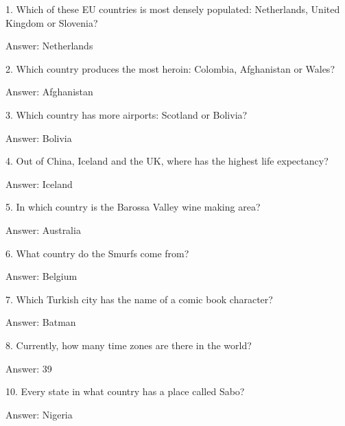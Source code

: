 \documentclass{beamer}
\begin{document}
    \begin{frame}
        1. Which of these EU countries is most densely populated: Netherlands,
        United Kingdom or Slovenia?

        Answer: Netherlands
    \end{frame}

    \begin{frame}
        2. Which country produces the most heroin: Colombia, Afghanistan or
        Wales?

        Answer: Afghanistan
    \end{frame}

    \begin{frame}
        3. Which country has more airports: Scotland or Bolivia?

        Answer: Bolivia
    \end{frame}

    \begin{frame}
        4. Out of China, Iceland and the UK, where has the highest life
        expectancy?

        Answer: Iceland
    \end{frame}

    \begin{frame}
        5. In which country is the Barossa Valley wine making area?

        Answer: Australia
    \end{frame}

    \begin{frame}
        6. What country do the Smurfs come from?

        Answer: Belgium
    \end{frame}

    \begin{frame}
        7. Which Turkish city has the name of a comic book character?

        Answer: Batman
    \end{frame}

    \begin{frame}
        8. Currently, how many time zones are there in the world?

        Answer: 39
    \end{frame}

    \begin{frame}
        10. Every state in what country has a place called Sabo?

        Answer: Nigeria
    \end{frame}
\end{document}
